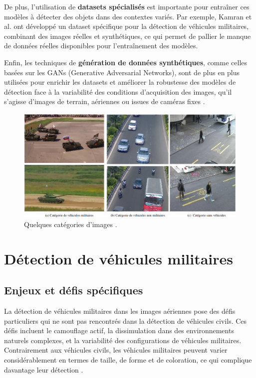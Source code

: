 De plus, l'utilisation de \textbf{datasets spécialisés} est importante pour entraîner ces modèles à détecter des objets dans des contextes variés. Par exemple, Kamran et al. \cite{kamran2020} ont développé un dataset spécifique pour la détection de véhicules militaires, combinant des images réelles et synthétiques, ce qui permet de pallier le manque de données réelles disponibles pour l'entraînement des modèles.

Enfin, les techniques de \textbf{génération de données synthétiques}, comme celles basées sur les GANs (Generative Adversarial Networks), sont de plus en plus utilisées pour enrichir les datasets et améliorer la robustesse des modèles de détection face à la variabilité des conditions d'acquisition des images, qu'il s'agisse d'images de terrain, aériennes ou issues de caméras fixes \cite{spie2020}.

\begin{figure}[H]
    \center
    \includegraphics[width=\textwidth]{./images/category-images.png}
    \caption{Quelques catégories d'images \cite[p.~5]{kamran2020}.}
    \label{fig:comparaison_vehicles}
\end{figure}


\section{Détection de véhicules militaires}

\subsection{Enjeux et défis spécifiques}

La détection de véhicules militaires dans les images aériennes pose des défis particuliers qui ne sont pas rencontrés dans la détection de véhicules civils. Ces défis incluent le camouflage actif, la dissimulation dans des environnements naturels complexes, et la variabilité des configurations de véhicules militaires. Contrairement aux véhicules civils, les véhicules militaires peuvent varier considérablement en termes de taille, de forme et de coloration, ce qui complique davantage leur détection \cite{kamran2020}.

